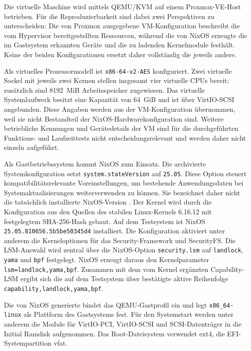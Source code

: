 Die virtuelle Maschine wird mittels QEMU/KVM auf einem Proxmox-VE-Host betrieben. Für die
Reproduzierbarkeit sind dabei zwei Perspektiven zu unterscheiden: Die von Proxmox ausgegebene
VM-Konfiguration beschreibt die vom Hypervisor bereitgestellten Ressourcen, während die von
NixOS erzeugte  die im Gastsystem erkannten Geräte und die zu
ladenden Kernelmodule festhält. Keine der beiden Konfigurationen ersetzt daher vollständig die
jeweils andere.

Als virtuelles Prozessormodell ist \texttt{x86-64-v2-AES} konfiguriert. Zwei virtuelle Sockel mit
jeweils zwei Kernen stellen insgesamt vier virtuelle CPUs bereit; zusätzlich sind 8192~MiB
Arbeitsspeicher zugewiesen. Das virtuelle Systemlaufwerk besitzt eine Kapazität von 64~GiB und ist
über VirtIO-SCSI angebunden. Diese Angaben werden aus der VM-Konfiguration übernommen, weil sie
nicht Bestandteil der NixOS-Hardwarekonfiguration sind. Weitere betriebliche Kennungen und
Gerätedetails der VM sind für die durchgeführten Funktions- und Laufzeittests nicht
entscheidungsrelevant und werden daher nicht einzeln aufgeführt.

Als Gastbetriebssystem kommt NixOS zum Einsatz. Die archivierte Systemkonfiguration setzt
\texttt{system.stateVersion} auf \texttt{25.05}. Diese Option steuert kompatibilitätsrelevante
Voreinstellungen, um bestehende Anwendungsdaten bei Systemaktualisierungen weiterverwenden zu
können. Sie bezeichnet daher nicht die tatsächlich installierte NixOS-Version
\citep{nixosStateVersion}. Der Kernel wird durch die Konfiguration aus den Quellen des stabilen
Linux-Kernels 6.16.12 mit festgelegtem SHA-256-Hash gebaut. Auf dem Testsystem ist NixOS
\texttt{25.05.810656.5b5be50345d4} installiert. Die Konfiguration aktiviert unter
anderem die Kerneloptionen für das Security-Framework und SecurityFS. Die LSM-Auswahl wird
zentral über die NixOS-Option \texttt{security.lsm} auf \texttt{landlock}, \texttt{yama} und
\texttt{bpf} festgelegt. NixOS erzeugt daraus den Kernelparameter
\texttt{lsm=landlock,yama,bpf}. Zusammen mit dem vom Kernel ergänzten Capability-LSM ergibt
sich die auf dem Testsystem über  bestätigte aktive Reihenfolge
\texttt{capability,landlock,yama,bpf}.

Die von NixOS generierte  bindet das QEMU-Gastprofil ein und
legt \texttt{x86\_64-linux} als Plattform des Gastsystems fest. Für den Systemstart werden unter
anderem die Module für VirtIO-PCI, VirtIO-SCSI und SCSI-Datenträger in die Initial Ramdisk
aufgenommen. Das Root-Dateisystem verwendet ext4, die EFI-Systempartition vfat.

